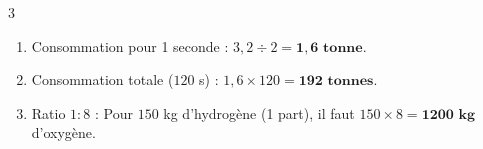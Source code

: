 \documentclass[a4paper]{book}
\begin{document}
{    \begin{exerciceNote}{3}
        \begin{enumerate}
            \item Consommation pour 1 seconde : $3,2 \div 2 = \mathbf{1,6 \text{ tonne}}$.
            \item Consommation totale ($120$ s) : $1,6 \times 120 = \mathbf{192 \text{ tonnes}}$.
            \item Ratio $1:8$ : Pour $150$ kg d'hydrogène (1 part), il faut $150 \times 8 = \mathbf{1200 \text{ kg}}$ d'oxygène.
        \end{enumerate}
    \end{exerciceNote}

}
\end{document}
